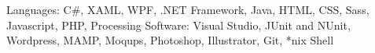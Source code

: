 Languages: C\#, XAML, WPF, .NET Framework, Java, HTML, CSS, Sass, Javascript, PHP, Processing 
Software: Visual Studio, JUnit and NUnit, Wordpress, MAMP, Moqups, Photoshop, Illustrator, Git, *nix Shell

